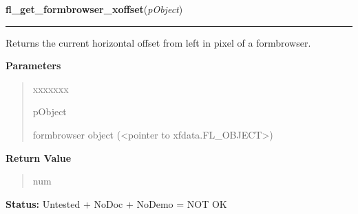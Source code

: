 \hspace{.8\funcindent}\begin{boxedminipage}{\funcwidth}

    \raggedright \textbf{fl\_get\_formbrowser\_xoffset}(\textit{pObject})

    \vspace{-1.5ex}

    \rule{\textwidth}{0.5\fboxrule}
\setlength{\parskip}{2ex}
    Returns the current horizontal offset from left in pixel of a 
    formbrowser.

\setlength{\parskip}{1ex}
      \textbf{Parameters}
      \vspace{-1ex}

      \begin{quote}
        \begin{Ventry}{xxxxxxx}

          \item[pObject]

          formbrowser object ({\textless}pointer to 
          xfdata.FL\_OBJECT{\textgreater})

        \end{Ventry}

      \end{quote}

      \textbf{Return Value}
    \vspace{-1ex}

      \begin{quote}
      num

      \end{quote}

\textbf{Status:} Untested + NoDoc + NoDemo = NOT OK



    \end{boxedminipage}

    \label{xformslib:library:fl_get_formbrowser_yoffset}

    \vspace{0.5ex}

